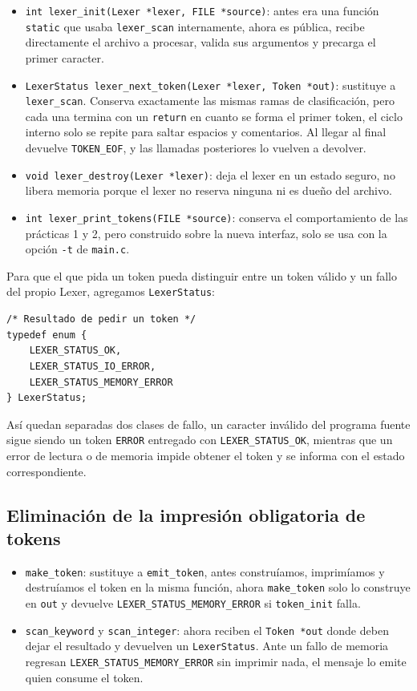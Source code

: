 \documentclass[12pt,letterpaper]{article}
\begin{document}
\begin{itemize}
\item \texttt{int lexer\_init(Lexer *lexer, FILE *source)}: antes era una función \texttt{static} que usaba
  \texttt{lexer\_scan} internamente, ahora es pública, recibe directamente el archivo a procesar, valida sus
  argumentos y precarga el primer caracter.
\item \texttt{LexerStatus lexer\_next\_token(Lexer *lexer, Token *out)}: sustituye a \texttt{lexer\_scan}.
  Conserva exactamente las mismas ramas de clasificación, pero cada una termina con un \texttt{return} en
  cuanto se forma el primer token, el ciclo interno solo se repite para saltar espacios y comentarios. Al
  llegar al final devuelve \texttt{TOKEN\_EOF}, y las llamadas posteriores lo vuelven a devolver.
\item \texttt{void lexer\_destroy(Lexer *lexer)}: deja el lexer en un estado seguro, no libera memoria
  porque el lexer no reserva ninguna ni es dueño del archivo.
\item \texttt{int lexer\_print\_tokens(FILE *source)}: conserva el comportamiento de las prácticas 1 y 2,
  pero construido sobre la nueva interfaz, solo se usa con la opción \texttt{-t} de \texttt{main.c}.
\end{itemize}

Para que el que pida un token pueda distinguir entre un token válido y un fallo del propio Lexer, agregamos
\texttt{LexerStatus}:

\begin{lstlisting}[style=modernc, caption={Enumeración \texttt{LexerStatus}, definida en \texttt{lexer.h}.}]
/* Resultado de pedir un token */
typedef enum {
    LEXER_STATUS_OK,
    LEXER_STATUS_IO_ERROR,
    LEXER_STATUS_MEMORY_ERROR
} LexerStatus;
\end{lstlisting}

\bigskip

Así quedan separadas dos clases de fallo, un caracter inválido del programa fuente sigue siendo un token
\texttt{ERROR} entregado con \texttt{LEXER\_STATUS\_OK}, mientras que un error de lectura o de memoria
impide obtener el token y se informa con el estado correspondiente.

\subsection*{Eliminación de la impresión obligatoria de tokens}

\begin{itemize}
\item \texttt{make\_token}: sustituye a \texttt{emit\_token}, antes construíamos, imprimíamos y
  destruíamos el token en la misma función, ahora \texttt{make\_token} solo lo construye en \texttt{out} y
  devuelve \texttt{LEXER\_STATUS\_MEMORY\_ERROR} si \texttt{token\_init} falla.
\item \texttt{scan\_keyword} y \texttt{scan\_integer}: ahora reciben el \texttt{Token *out} donde deben
  dejar el resultado y devuelven un \texttt{LexerStatus}. Ante un fallo de memoria regresan
  \texttt{LEXER\_STATUS\_MEMORY\_ERROR} sin imprimir nada, el mensaje lo emite quien consume el token.
\end{itemize}
\end{document}
